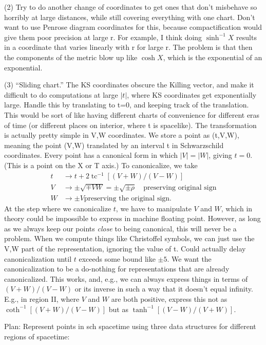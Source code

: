 \documentclass{article}
\begin{document}
(2) Try to do another change of coordinates to get ones that don't misbehave so horribly at
large distances, while still covering everything with one chart. Don't want to use Penrose diagram
coordinates for this, because compactification would give them poor precision at large r. For example,
I think doing $\sinh^{-1}X$ results in a coordinate that varies linearly with r for large r. The problem
is that then the components of the metric blow up like $\cosh X$, which is the exponential of an
exponential.

(3) ``Sliding chart.'' The KS coordinates obscure the Killing vector, and make it difficult
to do computations at large $|t|$, where KS coordinates get exponentially large.
Handle this by translating to t=0, and keeping track of the translation. This would be sort of like
having different charts of convenience for different eras of time (or different places on interior,
where t is spacelike). The transformation is actually pretty
simple in V,W coordinates. We store a point 
as (t,V,W), meaning the point (V,W) translated by an interval t in Schwarzschild coordinates.
Every point has a canonical form in which $|V|=|W|$, giving $t=0$. (This is a point on the X
or T axis.) To canonicalize, we take
\begin{align*}
  t &\rightarrow t+2\operatorname{tc}^{-1}[(V+W)/(V-W)] \\
  V &\rightarrow \pm\sqrt{\mp VW} = \pm\sqrt{\pm\rho} \quad \text{preserving original sign} \\
  W &\rightarrow \pm V \text{preserving the original sign}.
\end{align*}
At the step where we  canonicalize $t$, we have to manipulate $V$ and $W$, which in theory could
be impossible to express in machine floating point. However, as long as we always keep our points
\emph{close} to being canonical, this will never be a problem. When we compute things like Christoffel
symbols, we can just use the V,W part of the representation, ignoring the value of t. Could actually
delay canonicalization until $t$ exceeds some bound like $\pm5$. We want the canonicalization to be
a do-nothing for representations that are already canonicalized. This works, and, e.g., we can
always express things in terms of $(V+W)/(V-W)$ or its inverse in such a way that it doesn't equal
infinity. E.g., in region II, where $V$ and $W$ are both positive,
express this not as $\coth^{-1}[(V+W)/(V-W)]$ but as
$\tanh^{-1}[(V-W)/(V+W)]$.

Plan: Represent points in sch spacetime using three data structures for different regions of spacetime:
\end{document}
